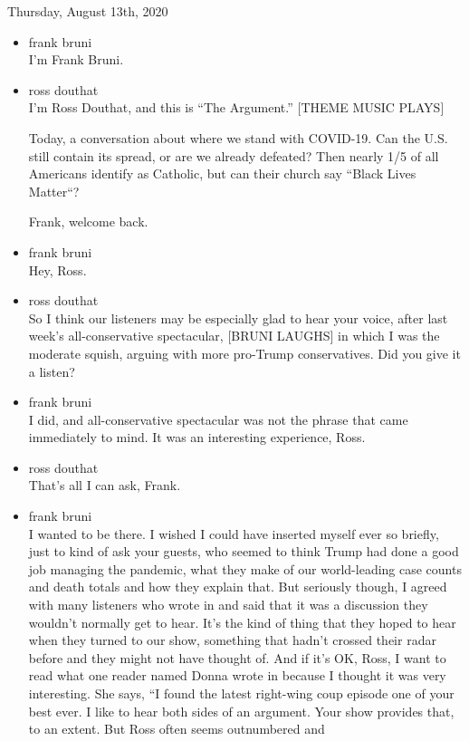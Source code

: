 Thursday, August 13th, 2020

\begin{itemize}
\item
  frank bruni\\
  I'm Frank Bruni.
\item
  ross douthat\\
  I'm Ross Douthat, and this is ``The Argument.'' {[}THEME MUSIC
  PLAYS{]}

  Today, a conversation about where we stand with COVID-19. Can the U.S.
  still contain its spread, or are we already defeated? Then nearly 1/5
  of all Americans identify as Catholic, but can their church say
  ``Black Lives Matter``?

  Frank, welcome back.
\item
  frank bruni\\
  Hey, Ross.
\item
  ross douthat\\
  So I think our listeners may be especially glad to hear your voice,
  after last week's all-conservative spectacular, {[}BRUNI LAUGHS{]} in
  which I was the moderate squish, arguing with more pro-Trump
  conservatives. Did you give it a listen?
\item
  frank bruni\\
  I did, and all-conservative spectacular was not the phrase that came
  immediately to mind. It was an interesting experience, Ross.
\item
  ross douthat\\
  That's all I can ask, Frank.
\item
  frank bruni\\
  I wanted to be there. I wished I could have inserted myself ever so
  briefly, just to kind of ask your guests, who seemed to think Trump
  had done a good job managing the pandemic, what they make of our
  world-leading case counts and death totals and how they explain that.
  But seriously though, I agreed with many listeners who wrote in and
  said that it was a discussion they wouldn't normally get to hear. It's
  the kind of thing that they hoped to hear when they turned to our
  show, something that hadn't crossed their radar before and they might
  not have thought of. And if it's OK, Ross, I want to read what one
  reader named Donna wrote in because I thought it was very interesting.
  She says, ``I found the latest right-wing coup episode one of your
  best ever. I like to hear both sides of an argument. Your show
  provides that, to an extent. But Ross often seems outnumbered and

\end{itemize}
